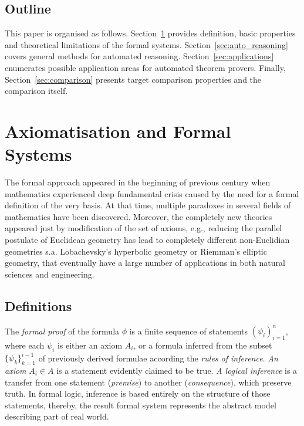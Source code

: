 \documentclass[article]{aaltoseries}
\begin{document}

\subsection{Outline}
This paper is organised as follows.
Section~\ref{sec:formal_theory} provides definition, basic properties and theoretical limitations of the formal systems. Section~\ref{sec:auto_reasoning} covers general methods for automated reasoning. Section~\ref{sec:applications} enumerates possible application areas for automated theorem provers. Finally, Section~\ref{sec:comparison} presents target comparison properties and the comparison itself.


\section{Axiomatisation and Formal Systems}
\label{sec:formal_theory}

The formal approach appeared in the beginning of previous century when mathematics experienced deep fundamental crisis caused by the need for a formal definition of the very basis. At that time, multiple paradoxes in several fields of mathematics have been discovered. Moreover, the completely new theories appeared just by modification of the set of axioms, e.g., reducing the parallel postulate of Euclidean geometry has lead to completely different non-Euclidian geometries s.a. Lobachevsky's hyperbolic geometry or Riemman's elliptic geometry, that eventually have a large number of applications in both natural sciences and engineering.

\subsection{Definitions}
\label{sec:definitions}

The \textit{formal proof} of the formula $\phi$ is a finite sequence of statements $ ( \psi_i )_{i=1}^{n} $, where each $\psi_i$ is either an axiom $A_i$, or a formula inferred from the subset $\{ \psi_k \}_{k=1}^{i-1}$ of previously derived formulae according the \textit{rules of inference}. \textit{An axiom} $A_i \in A$ is a statement evidently claimed to be true. \textit{A logical inference} is a transfer from one statement (\textit{premise}) to another (\textit{consequence}), which preserve truth. In formal logic, inference is based entirely on the structure of those statements, thereby, the result formal system represents the abstract model describing part of real world.
\end{document}
